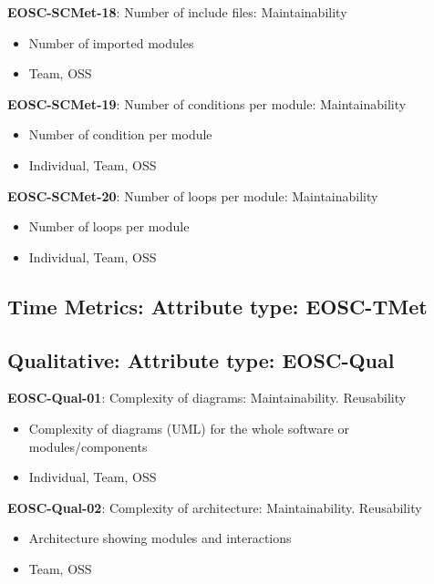 \textbf{EOSC-SCMet-18}: Number of include files: Maintainability

\begin{itemize}
    \item Number of imported modules \cite{ogasawara_experiences_1996}
    \item Team, OSS
\end{itemize}

\textbf{EOSC-SCMet-19}: Number of conditions per module: Maintainability

\begin{itemize}
    \item Number of condition per module \cite{ogasawara_experiences_1996}
    \item Individual, Team, OSS
\end{itemize}

\textbf{EOSC-SCMet-20}: Number of loops per module: Maintainability

\begin{itemize}
    \item Number of loops per module \cite{ogasawara_experiences_1996}
    \item Individual, Team, OSS
\end{itemize}

\subsection{Time Metrics: Attribute type: EOSC-TMet}

\subsection{Qualitative: Attribute type: EOSC-Qual}

\textbf{EOSC-Qual-01}: Complexity of diagrams: Maintainability. Reusability

\begin{itemize}
    \item Complexity of diagrams (UML) for the whole software or modules/components \cite{montagud_systematic_2012}
    \item Individual, Team, OSS
\end{itemize}

\textbf{EOSC-Qual-02}: Complexity of architecture: Maintainability. Reusability

\begin{itemize}
    \item Architecture showing modules and interactions \cite{montagud_systematic_2012,zuser_software_2005}
    \item Team, OSS
\end{itemize}

